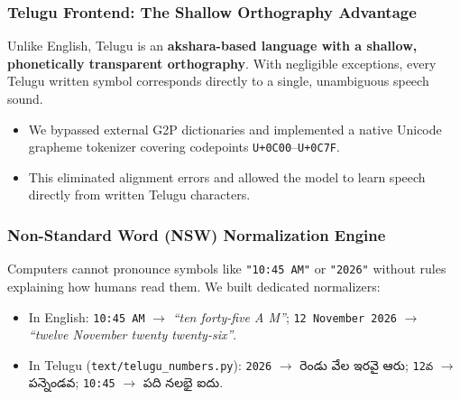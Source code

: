 \documentclass[11pt,a4paper]{article}
\newcommand{\te}[1]{{\telugufont #1}}
\begin{document}
\subsubsection{Telugu Frontend: The Shallow Orthography Advantage}
Unlike English, Telugu is an \textbf{akshara-based language with a shallow, phonetically transparent orthography}. With negligible exceptions, every Telugu written symbol corresponds directly to a single, unambiguous speech sound.
\begin{itemize}
  \item We bypassed external G2P dictionaries and implemented a native Unicode grapheme tokenizer covering codepoints \texttt{U+0C00}--\texttt{U+0C7F}.
  \item This eliminated alignment errors and allowed the model to learn speech directly from written Telugu characters.
\end{itemize}

\subsubsection{Non-Standard Word (NSW) Normalization Engine}
Computers cannot pronounce symbols like \texttt{"10:45 AM"} or \texttt{"2026"} without rules explaining how humans read them. We built dedicated normalizers:
\begin{itemize}
  \item In English: \texttt{10:45 AM} $\rightarrow$ \textit{``ten forty-five A M''}; \texttt{12 November 2026} $\rightarrow$ \textit{``twelve November twenty twenty-six''}.
  \item In Telugu (\texttt{text/telugu\_numbers.py}): \texttt{2026} $\rightarrow$ \te{రెండు వేల ఇరవై ఆరు}; \texttt{12వ} $\rightarrow$ \te{పన్నెండవ}; \texttt{10:45} $\rightarrow$ \te{పది నలభై ఐదు}.
\end{itemize}

\newpage
\end{document}
